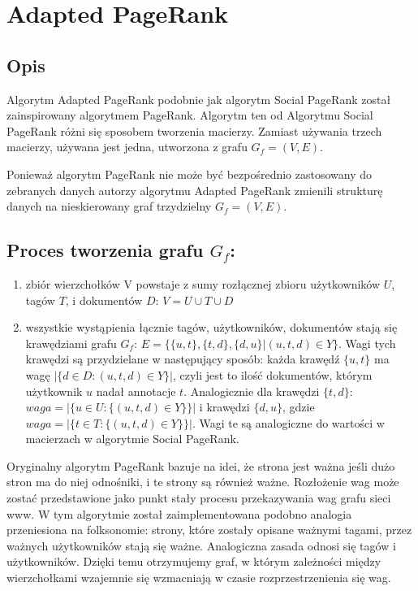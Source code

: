 \section{Adapted PageRank}
\subsection{Opis}

Algorytm Adapted PageRank podobnie jak algorytm Social PageRank został zainspirowany algorytmem PageRank. Algorytm ten od Algorytmu Social PageRank różni się sposobem tworzenia macierzy. Zamiast używania trzech macierzy, używana jest jedna, utworzona z grafu $G_f = (V,E)$.


Ponieważ algorytm PageRank nie może być bezpośrednio zastosowany do zebranych danych autorzy algorytmu Adapted PageRank zmienili strukturę danych na nieskierowany graf trzydzielny $ G_f = (V,E)$.


\subsection*{Proces tworzenia grafu $G_f$:}

\begin{enumerate}
\item zbiór wierzchołków V powstaje z sumy rozłącznej zbioru użytkowników $U$, tagów $T$, i dokumentów $D$: $V = U \cup T \cup D$

\item wszystkie wystąpienia łącznie tagów, użytkowników, dokumentów  stają się krawędziami grafu $G_f$: $E = \{\{u,t\}, \{t,d\} ,\{d,u\} | (u,t,d) \in Y \}$. Wagi tych krawędzi są przydzielane w następujący sposób: każda krawędź $\{u,t\}$ ma wagę $| \{d \in D : (u,t,d) \in Y\}|$, czyli jest to ilość dokumentów, którym użytkownik $u$ nadał annotacje $t$. Analogicznie dla krawędzi $\{t,d\}$: $waga=|\{u \in U : \{(u,t,d) \in Y\}\}|$ i krawędzi $\{d, u\}$, gdzie $waga=| \{t \in T : \{(u,t,d) \in Y \} \} |$. Wagi te są analogiczne do wartości w macierzach w algorytmie Social PageRank.
\end{enumerate}

Oryginalny algorytm PageRank bazuje na idei, że strona jest ważna jeśli dużo stron ma do niej odnośniki, i te strony są również ważne. Rozłożenie wag może zostać przedstawione jako punkt stały procesu przekazywania wag grafu sieci www. W tym algorytmie został zaimplementowana podobno analogia przeniesiona na folksonomie: strony, które zostały opisane ważnymi tagami, przez ważnych użytkowników stają się ważne. Analogiczna zasada odnosi się tagów i użytkowników. Dzięki temu otrzymujemy graf, w którym zależności między wierzchołkami wzajemnie się wzmacniają w czasie rozprzestrzenienia się wag.


